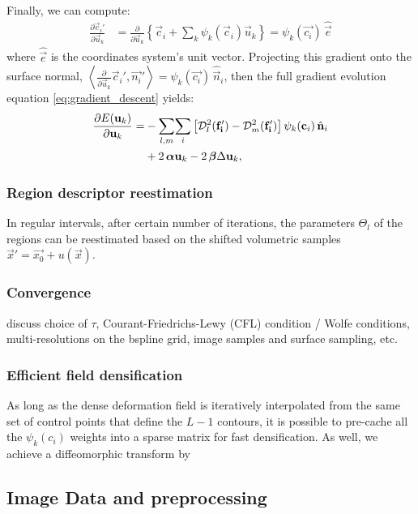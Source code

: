 Finally, we can compute:
  \begin{align}
  \frac{\partial \vec{c}_i'}{\partial \vec{u}_k} &= \frac{\partial}{\partial \vec{u}_k}
  \left\{ \vec{c}_i + \sum_k \psi_k(\vec{c}_i) \vec{u}_k \right\}
  = \psi_k(\vec{c_i})\, \hat{\vec{e}}
  \end{align}
  where $\hat{\vec{e}}$ is the coordinates system's unit vector.
  Projecting this gradient onto the surface normal,
  $\left\langle \frac{\partial}{\partial \vec{u}_k}{\vec{c}_i}', \vec{n_i}'\right\rangle
  = \psi_k(\vec{c_i})\, \hat{\vec{n}}_i$, then the
  full gradient evolution equation \eqref{eq:gradient_descent} yields:
  \begin{align}
  \frac{\partial E(\vec{u}_k)}{\partial \vec{u}_k} =
  &- \underset{l,m}{\sum} \underset{i}{\sum}
  \left[ \mdist{f_i'}{l} - \mdist{f_i'}{m} \right]
  \psi_k(\vec{c}_i)\, \hat{\vec{n}}_i \notag\\
  &+2\, \boldsymbol{\alpha} \vec{u}_k
  -2\, \boldsymbol{\beta} \Delta \vec{u}_k,
  \label{eq:gradient_final}
  \end{align}

\subsubsection{Region descriptor reestimation}
In regular intervals, after certain number of iterations,
the parameters $\Theta_l$ of the regions can be reestimated
based on the shifted volumetric samples
$\vec{x}' = \vec{x_0} + u(\vec{x})$.

\subsubsection{Convergence}
{\color{red} discuss choice of $\tau$, Courant-Friedrichs-Lewy (CFL) condition / Wolfe conditions, multi-resolutions on the bspline grid, image samples and surface sampling,  etc.}

\subsubsection{Efficient field densification}
As long as the dense deformation field is iteratively interpolated
from the same set of control points that define the $L-1$ contours,
it is possible to pre-cache all the $\psi_k(c_i)$ weights into a
sparse matrix for fast densification. As well, we achieve a
diffeomorphic transform by


\subsection{Image Data and preprocessing}
\label{sec:datasets}

